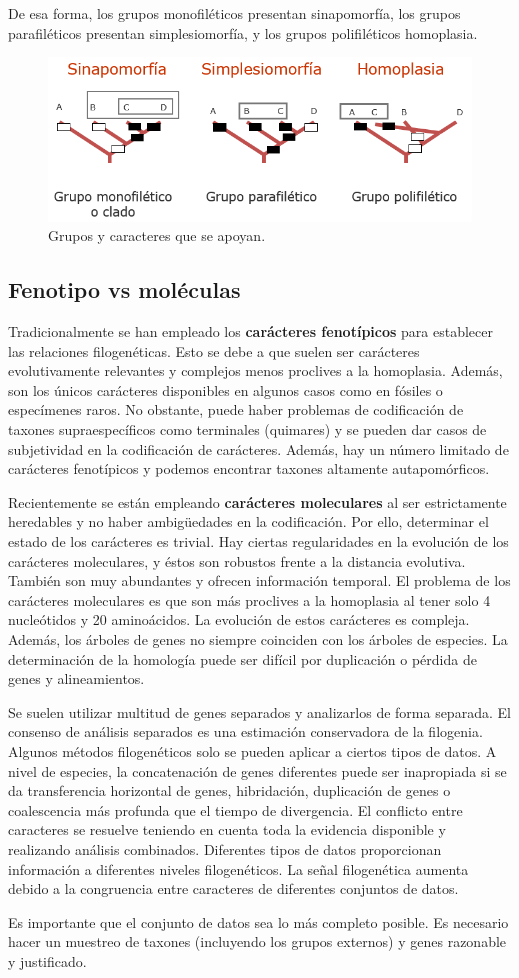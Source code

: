 De esa forma, los grupos monofiléticos presentan sinapomorfía, los grupos parafiléticos presentan simplesiomorfía, y los grupos polifiléticos homoplasia. 

\begin{figure}[htbp]
\centering
\includegraphics[width=0.5\linewidth]{figs/homoplasia-agrupamientos.png}
\caption{Grupos y caracteres que se apoyan.}
\end{figure}

\subsection{Fenotipo vs moléculas}
Tradicionalmente se han empleado los \textbf{carácteres fenotípicos} para establecer las relaciones filogenéticas. Esto se debe a que suelen ser carácteres evolutivamente relevantes y complejos menos proclives a la homoplasia. Además, son los únicos carácteres disponibles en algunos casos como en fósiles o especímenes raros. No obstante, puede haber problemas de codificación de taxones supraespecíficos como terminales (quimares) y se pueden dar casos de subjetividad en la codificación de carácteres. Además, hay un número limitado de carácteres fenotípicos y podemos encontrar taxones altamente autapomórficos. 

Recientemente se están empleando \textbf{carácteres moleculares} al ser estrictamente heredables y no haber ambigüedades en la codificación. Por ello, determinar el estado de los carácteres es trivial. Hay ciertas regularidades en la evolución de los carácteres moleculares, y éstos son robustos frente a la distancia evolutiva. También son muy abundantes y ofrecen información temporal. El problema de los carácteres moleculares es que son más proclives a la homoplasia al tener solo 4 nucleótidos y 20 aminoácidos. La evolución de estos carácteres es compleja. Además, los árboles de genes no siempre coinciden con los árboles de especies. La determinación de la homología puede ser difícil por duplicación o pérdida de genes y alineamientos. 

Se suelen utilizar multitud de genes separados y analizarlos de forma separada. El consenso de análisis separados es una estimación conservadora de la filogenia. Algunos métodos filogenéticos solo se pueden aplicar a ciertos tipos de datos. A nivel de especies, la concatenación de genes diferentes puede ser inapropiada si se da transferencia horizontal de genes, hibridación, duplicación de genes o coalescencia más profunda que el tiempo de divergencia. El conflicto entre caracteres se resuelve teniendo en cuenta toda la evidencia disponible y realizando análisis combinados. Diferentes tipos de datos proporcionan información a diferentes niveles filogenéticos. La señal filogenética aumenta debido a la congruencia entre caracteres de diferentes conjuntos de datos. 

Es importante que el conjunto de datos sea lo más completo posible. Es necesario hacer un muestreo de taxones (incluyendo los grupos externos) y genes razonable y justificado. 
